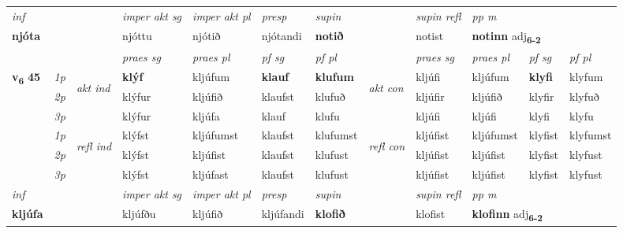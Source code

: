 \begin{longtable}[l]{X>{\footnotesize\itshape}llXXXXlXXXX}
   {\textit{inf}} & &  & \textit{imper akt sg} & \textit{imper akt pl}   & \textit{presp} & \textit{supin} && \textit{supin refl} & \textit{pp m} \\*
  {\textbf{njóta}} & && njóttu  & njótið   & njótandi &  \textbf{notið} && notist & \multicolumn{2}{l}{\textbf{notinn} adj\textbf{\textsubscript{6-2}}} \\*

\midrule

 & &   & \textit{praes sg}  & \textit{praes pl}    & \textit{ pf sg} & \textit{pf pl} & & \textit{praes sg}  & \textit{praes pl}    & \textit{pf sg} & \textit{pf pl }  \\ \cmidrule{4-7} \cmidrule{9-12}
 \multirow{2}{*}{{{\textbf{v{\textsubscript{6}}} \Large{\textbf{45}}}}}  & 1p & \multirow{3}{*}{\begin{turn}{90}\textit{akt ind}\end{turn}} & \textbf{klýf} & kljúfum & \textbf{klauf} & \textbf{klufum} & \multirow{3}{*}{\begin{turn}{90}\textit{akt con}\end{turn}} &kljúfi & kljúfum & \textbf{klyfi} & klyfum\\*
 & 2p &  &  klýfur  & kljúfið & klaufst & klufuð & & kljúfir & kljúfið & klyfir & klyfuð \\*
 & 3p &  & klýfur & kljúfa & klauf & klufu & & kljúfi & kljúfi& klyfi & klyfu \\*
\cmidrule{4-7} \cmidrule{9-12}
 & 1p & \multirow{3}{*}{\begin{turn}{90}\textit{refl ind}\end{turn}}  & klýfst & kljúfumst & klaufst & klufumst & \multirow{3}{*}{\begin{turn}{90}\textit{refl con}\end{turn}}  &kljúfist & kljúfumst & klyfist & klyfumst \\*
 & 2p &  & klýfst & kljúfist & klaufst & klufust & &kljúfist & kljúfist & klyfist & klyfust \\*
 & 3p  & & klýfst & kljúfast & klaufst & klufust & & kljúfist & kljúfist& klyfist & klyfust \\*
\cmidrule{4-7} \cmidrule{9-12}

   {\textit{inf}} & &  & \textit{imper akt sg} & \textit{imper akt pl}   & \textit{presp} & \textit{supin} && \textit{supin refl} & \textit{pp m} \\*
  {\textbf{kljúfa}} & && kljúfðu  & kljúfið   & kljúfandi &  \textbf{klofið} && klofist & \multicolumn{2}{l}{\textbf{klofinn} adj\textbf{\textsubscript{6-2}}} \\*


\end{longtable}

